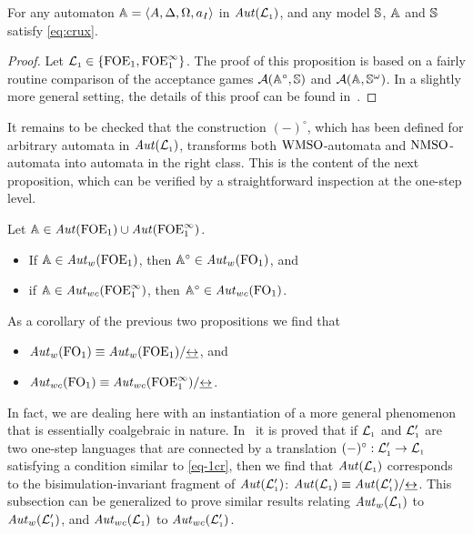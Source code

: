 \begin{proposition}
For any automaton $\mathbb{A} = \langle{A,\Delta,\Omega,a_{I}}\rangle$ in $\mathit{Aut}(\mathcal{L}_{\scriptscriptstyle 1})$, and any
model $\mathbb{S}$, $\mathbb{A}$ and $\mathbb{S}$ satisfy \eqref{eq:crux}.
\end{proposition}

\begin{proof} Let $\mathcal{L}_{\scriptscriptstyle 1}\in \{{\mathrm{FOE}_1},{\mathrm{FOE}^{\infty}_1}\}$.
The proof of this proposition is based on a fairly routine comparison of the 
acceptance games $\mathcal{A}(\mathbb{A}^{\circ},\mathbb{S})$ and 
$\mathcal{A}(\mathbb{A},\mathbb{S}^{\omega})$.
In a slightly more general setting, the details of this proof can be found 
in~\cite{Venxx}.
\end{proof}
\medskip

It remains to be checked that the construction $(-)^{\circ}$, which has
been defined for arbitrary automata in $\mathit{Aut}(\mathcal{L}_{\scriptscriptstyle 1})$, transforms 
both $\mathrm{WMSO}$-automata and $\mathrm{NMSO}$-automata into automata in the right class.
This is the content of the next proposition, which can be verified by a 
straightforward inspection at the one-step level.
\begin{proposition}
Let $\mathbb{A} \in \mathit{Aut}(\mathrm{FOE}_1)\cup\mathit{Aut}(\mathrm{FOE}^{\infty}_1)$. 
\begin{itemize}
\item If $\mathbb{A} \in \mathit{Aut}_{w}(\mathrm{FOE}_1)$, then $\mathbb{A}^{\circ} \in \mathit{Aut}_{w}(\mathrm{FO}_1)$, and
\item if $\mathbb{A} \in \mathit{Aut}_{wc}(\mathrm{FOE}^{\infty}_1)$, then $\mathbb{A}^{\circ} \in \mathit{Aut}_{wc}(\mathrm{FO}_1)$.
\end{itemize}
\end{proposition}


\begin{remark}{\rm
As a corollary of the previous two propositions we find that 
\begin{itemize}
	 pt
	\item $\mathit{Aut}_{w}(\mathrm{FO}_1) \equiv \mathit{Aut}_{w}(\mathrm{FOE}_1)/{\mathrel{\underline{\leftrightarrow}}}$, and
	\item $\mathit{Aut}_{wc}(\mathrm{FO}_1) \equiv \mathit{Aut}_{wc}(\mathrm{FOE}^{\infty}_1)/{\mathrel{\underline{\leftrightarrow}}}$.
\end{itemize}
In fact, we are dealing here with an instantiation of a more general phenomenon 
that is essentially coalgebraic in nature.
In~\cite{Venxx} it is proved that if $\mathcal{L}_{\scriptscriptstyle 1}$ and $\mathcal{L}_{\scriptscriptstyle 1}'$ are two one-step
languages that are connected by a translation $(-)^{\circ}: \mathcal{L}_{\scriptscriptstyle 1}' \to 
\mathcal{L}_{\scriptscriptstyle 1}$ satisfying a condition similar to \eqref{eq-1cr}, then we find that 
$\mathit{Aut}(\mathcal{L}_{\scriptscriptstyle 1})$ corresponds to the bisimulation-invariant fragment of 
$\mathit{Aut}(\mathcal{L}_{\scriptscriptstyle 1}')$: $\mathit{Aut}(\mathcal{L}_{\scriptscriptstyle 1}) \equiv \mathit{Aut}(\mathcal{L}_{\scriptscriptstyle 1}')/{\mathrel{\underline{\leftrightarrow}}}$.
This subsection can be generalized to prove similar results relating
$\mathit{Aut}_{w}(\mathcal{L}_{\scriptscriptstyle 1})$ to $\mathit{Aut}_{w}(\mathcal{L}_{\scriptscriptstyle 1}')$, and $\mathit{Aut}_{wc}(\mathcal{L}_{\scriptscriptstyle 1})$ to 
$\mathit{Aut}_{wc}(\mathcal{L}_{\scriptscriptstyle 1}')$.
}\end{remark}
